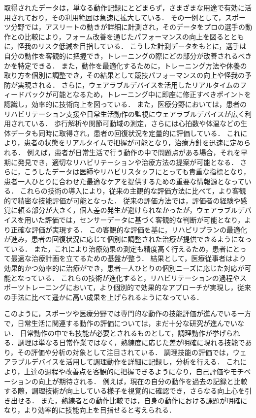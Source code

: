 取得されたデータは，単なる動作記録にとどまらず，さまざまな用途で有効に活用されており，その利用範囲は急速に拡大している．
その一例として，スポーツ分野では，アスリートの動きが詳細に計測され，そのデータをプロの選手の動作との比較により，フォーム改善を通じたパフォーマンスの向上を図るとともに，怪我のリスク低減を目指している．
こうした計測データをもとに，選手は自分の動作を客観的に把握でき，トレーニングの際にどの部分が改善されるべきかを特定できる．
また，動作を最適化するために，トレーニング方法や休養の取り方を個別に調整でき，その結果として競技パフォーマンスの向上や怪我の予防が実現される．
さらに，ウェアラブルデバイスを活用したリアルタイムのフィードバックが可能となるため，トレーニング中に即座に修正すべきポイントを認識し，効率的に技術向上を図っている．
また，医療分野においては，患者のリハビリテーション支援や日常生活動作の監視にウェアラブルデバイスが広く利用されている．
歩行解析や関節可動域の測定，さらには心拍数や体温などの生体データも同時に取得され，患者の回復状況を定量的に評価している．
これにより，患者の状態をリアルタイムで把握が可能となり，治療方針を迅速に定められる．
例えば，患者が日常生活で行う動作の中で問題点がある場合，それを早期に発見でき，適切なリハビリテーションや治療方法の提案が可能となる．
さらに，こうしたデータは医師やリハビリスタッフにとっても貴重な指標となり，患者一人ひとりに合わせた最適なケアを提供するための重要な情報源となっている．
これらの技術の導入により，従来の主観的な評価方法に比べて，より客観的で精密な技能評価が可能となった．
従来の評価方法では，評価者の経験や感覚に頼る部分が大きく，個人差の発生が避けられなかったが，ウェアラブルデバイスを用いた評価では，センサーデータに基づく客観的な判断が可能となり，より正確な評価が実現する．
この客観的な評価を基に，リハビリプランの最適化が進み，患者の回復状況に応じて個別に調整された治療が提供できるようになっている．
また，これにより治療効果の測定も精度高く行えるため，患者にとって最適な治療計画を立てるための基盤が整う．
結果として，医療従事者はより効果的かつ効率的に治療ができ，患者一人ひとりの個別ニーズに応じた対応が可能となっている．
これらの技術が進化すると，リハビリテーションの過程やスポーツトレーニングにおいて，より個別的で効果的なアプローチが実現し，従来の手法に比べて遥かに高い成果を上げられるようになっている．

このように，スポーツや医療分野では専門的な動作の技能評価が進んでいる一方で，日常生活に関連する動作の評価については，まだ十分な研究が進んでいない．
日常動作の中でも技能が必要とされるものとして，調理動作が挙げられる．調理は単なる日常作業ではなく，熟練度に応じた差が明確に現れる技能であり，その評価や分析の対象として注目されている．
調理技能の評価では，ウェアラブルデバイスを活用して調理動作を詳細に記録し，分析を行える．
これにより，上達の過程や改善点を客観的に把握できるようになり，自己評価やモチベーションの向上が期待される．
例えば，現在の自分の動作を過去の記録と比較する際，調理技術が向上している様子を視覚的に確認でき，さらなる向上心を引き出せる．
また，熟練者との動作比較では，自身の動作における課題が明確になり，より効率的に技能向上を目指せると考えられる．

